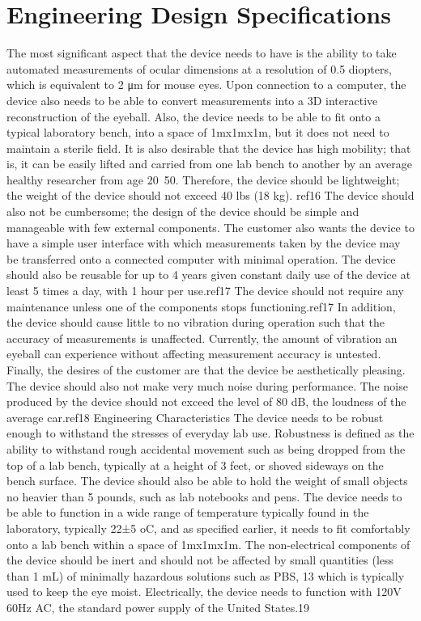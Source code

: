 \documentclass{article}
\begin{document}
\section{Engineering Design Specifications}
\label{sec:engin-design-spec}

The most significant aspect that the device needs to have is the ability to take automated
measurements of ocular dimensions at a resolution of 0.5 diopters, which is equivalent to 2
μm for mouse eyes. Upon connection to a computer, the device also needs to be able to 
convert measurements into a 3D interactive reconstruction of the eyeball. Also, the device 
needs to be able to fit onto a typical laboratory bench, into a space of 1mx1mx1m, but it 
does not need to maintain a sterile field.
It is also desirable that the device has high mobility; that is, it can be easily
lifted and carried from one lab bench to another by an average healthy researcher from age
20~50. Therefore, the device should be lightweight; the weight of the device should not
exceed 40 lbs (18 kg).\cite{gross03} ref16 The device should also not be cumbersome; the design of the 
device should be simple and manageable with few external components.
The customer also wants the device to have a simple user interface with which
measurements taken by the device may be transferred onto a connected computer with minimal operation.
The device should also be reusable for up to 4 years given constant
daily use of the device at least 5 times a day, with 1 hour per use.\cite{keyence01}ref17 The device should not
require any maintenance unless one of the components stops functioning.\cite{keyence01}ref17 In addition, the
device should cause little to no vibration during operation such that the accuracy of
measurements is unaffected. Currently, the amount of vibration an eyeball can experience
without affecting measurement accuracy is untested.
Finally, the desires of the customer are that the device be aesthetically pleasing. The device
should also not make very much noise during performance. The noise produced by the
device should not exceed the level of 80 dB, the loudness of the average car.\cite{truax09}ref18
Engineering Characteristics
The device needs to be robust enough to withstand the stresses of everyday lab use.
Robustness is defined as the ability to withstand rough accidental movement such as being
dropped from the top of a lab bench, typically at a height of 3 feet, or shoved sideways on
the bench surface. The device should also be able to hold the weight of small objects no
heavier than 5 pounds, such as lab notebooks and pens. The device needs to be able to
function in a wide range of temperature typically found in the laboratory, typically 22±5 oC,
and as specified earlier, it needs to fit comfortably onto a lab bench within a space of
1mx1mx1m. The non-electrical components of the device should be inert and should not be
affected by small quantities (less than 1 mL) of minimally hazardous solutions such as PBS,
\cite{users_manual}13
which is typically used to keep the eye moist. Electrically, the device needs to function with
120V 60Hz AC, the standard power supply of the United States.19
\end{document}
